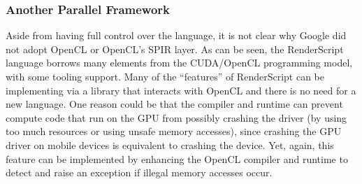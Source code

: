 \subsubsection{Another Parallel Framework}

Aside from having full control over the language, it is not clear why
 Google did not adopt OpenCL or OpenCL's SPIR layer.
As can be seen, the RenderScript language borrows many elements from the CUDA/OpenCL 
 programming model, with some tooling support.
Many of the ``features'' of RenderScript can be implementing via a library that 
 interacts with OpenCL and there is no need for a new language.
One reason could be that the compiler and runtime can prevent compute code that run on the GPU from
 possibly crashing the driver (by using too much resources or using unsafe memory accesses),
 since crashing the GPU driver on mobile devices is equivalent to crashing the device.
Yet, again, this feature can be implemented by enhancing the OpenCL compiler and runtime to detect
 and raise an exception if illegal memory accesses occur.

